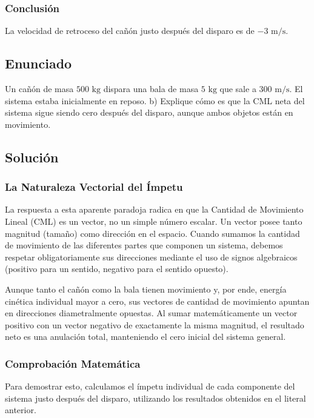 \documentclass{article}
\begin{document}
\subsubsection*{Conclusión}
La velocidad de retroceso del cañón justo después del disparo es de $-3 \text{ m/s}$.

\newpage

\subsection*{Enunciado}
Un cañón de masa $500 \text{ kg}$ dispara una bala de masa $5 \text{ kg}$ que sale a $300 \text{ m/s}$. El sistema estaba inicialmente en reposo.
b) Explique cómo es que la CML neta del sistema sigue siendo cero después del disparo, aunque ambos objetos están en movimiento.

\subsection*{Solución}

\subsubsection*{La Naturaleza Vectorial del Ímpetu}
La respuesta a esta aparente paradoja radica en que la Cantidad de Movimiento Lineal (CML) es un vector, no un simple número escalar. Un vector posee tanto magnitud (tamaño) como dirección en el espacio. Cuando sumamos la cantidad de movimiento de las diferentes partes que componen un sistema, debemos respetar obligatoriamente sus direcciones mediante el uso de signos algebraicos (positivo para un sentido, negativo para el sentido opuesto). 

Aunque tanto el cañón como la bala tienen movimiento y, por ende, energía cinética individual mayor a cero, sus vectores de cantidad de movimiento apuntan en direcciones diametralmente opuestas. Al sumar matemáticamente un vector positivo con un vector negativo de exactamente la misma magnitud, el resultado neto es una anulación total, manteniendo el cero inicial del sistema general.

\subsubsection*{Comprobación Matemática}
Para demostrar esto, calculamos el ímpetu individual de cada componente del sistema justo después del disparo, utilizando los resultados obtenidos en el literal anterior.
\end{document}
